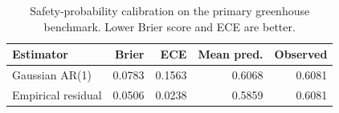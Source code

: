 \begin{table}[t]
\centering
\caption{Safety-probability calibration on the primary greenhouse benchmark. Lower Brier score and ECE are better.}
\label{tab:safety_calibration}
\begin{tabular}{lrrrr}
\hline
Estimator & Brier & ECE & Mean pred. & Observed \\
\hline
Gaussian AR(1) & 0.0783 & 0.1563 & 0.6068 & 0.6081 \\
Empirical residual & 0.0506 & 0.0238 & 0.5859 & 0.6081 \\
\hline
\end{tabular}
\end{table}

